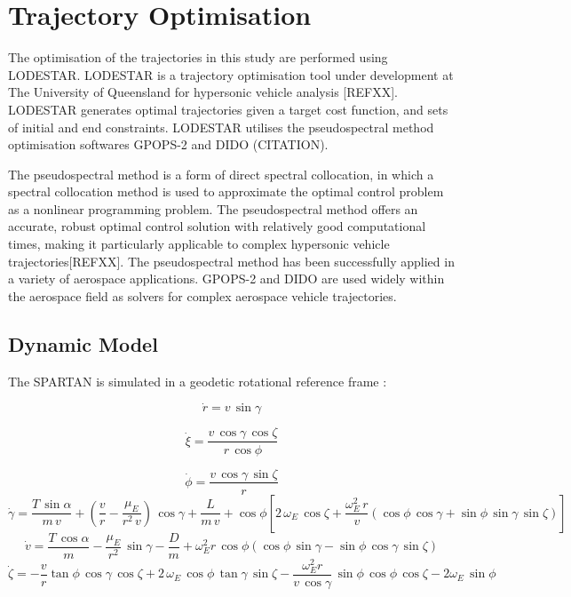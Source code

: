 \documentclass{article}
\begin{document}
\section{Trajectory Optimisation}\label{sec:opt}
The optimisation of the trajectories in this study are performed using LODESTAR. LODESTAR is a trajectory optimisation tool under development at The University of Queensland for hypersonic vehicle analysis [REFXX]. LODESTAR generates optimal trajectories given a target cost function, and sets of initial and end constraints. LODESTAR utilises the pseudospectral method optimisation softwares GPOPS-2\cite{Patterson2015} and DIDO (CITATION). 

The pseudospectral method is a form of direct spectral collocation, in which a spectral collocation method is used to approximate the optimal control problem as a nonlinear programming problem. The pseudospectral method offers an accurate, robust optimal control solution with relatively good computational times, making it particularly applicable to complex hypersonic vehicle trajectories[REFXX].  The pseudospectral method has been successfully applied in a variety of aerospace applications. GPOPS-2 and DIDO are used widely within the aerospace field as solvers for complex aerospace vehicle trajectories.


\subsection{Dynamic Model}

The SPARTAN is simulated in a geodetic rotational reference frame \cite{Josselyn2002a}: 

\begin{equation}
\dot{r} = v \, \sin \gamma
\end{equation}

\begin{equation}
\dot{\xi} = \frac{v \, \cos \gamma \, \cos \zeta}{r \, \cos \phi}
\end{equation}

\begin{equation}
\dot{\phi} = \frac{v\,\cos\gamma\,\sin\zeta}{r}
\end{equation}
\begin{equation}
\dot{\gamma} = \frac{T\,\sin\alpha}{m\,v}+ (\frac{v}{r}-\frac{\mu_E}{r^2 \,v})\,\cos\gamma + \frac{L}{m\,v}
+ \cos\phi[2\,\omega_E\, \cos\zeta + \frac{\omega_E^2\, r}{v}(\cos\phi\,\cos\gamma+\sin\phi\,\sin\gamma\,\sin\zeta)]
\end{equation}
\begin{equation}
\dot{v} = \frac{T\,\cos\alpha}{m}-\frac{\mu_E}{r^2}\,\sin\gamma - \frac{D}{m}
+ \omega_E^2 r\,\cos\phi(\cos\phi\,\sin\gamma-\sin\phi\,\cos\gamma\,\sin\zeta)
\end{equation}
\begin{equation}
\dot{\zeta} = -\frac{v}{r}\tan\phi\,\cos\gamma\,\cos\zeta +2\,\omega_E\,\cos\phi\,\tan\gamma\,\sin\zeta - \frac{\omega_E^2 r}{v\,\cos\gamma}\,\sin\phi \, \cos\phi\,\cos\zeta-2\omega_E\,\sin\phi 
\end{equation}
\end{document}
